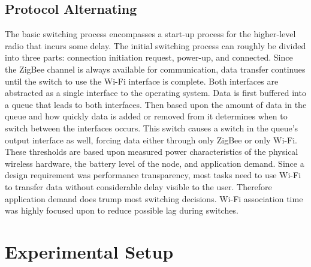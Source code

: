 \documentclass[conference]{IEEEtran}
\begin{document}
\subsection{Protocol Alternating}
The basic switching process encompasses a start-up process for the
higher-level radio that incurs some delay.  The initial switching
process can roughly be divided into three parts: connection
initiation request, power-up, and connected.  Since the ZigBee
channel is always available for communication, data transfer
continues until the switch to use the Wi-Fi interface is complete.
Both interfaces are abstracted as a single interface to the
operating system.  Data is first buffered into a queue that leads to
both interfaces.  Then based upon the amount of data in the queue
and how quickly data is added or removed from it determines when to
switch between the interfaces occurs.  This switch causes a switch
in the queue's output interface as well, forcing data either through
only ZigBee or only Wi-Fi.  These thresholds are based upon measured
power characteristics of the physical wireless hardware, the battery
level of the node, and application demand.  Since a design
requirement was performance transparency, most tasks need to use
Wi-Fi to transfer data without considerable delay visible to the
user.  Therefore application demand does trump most switching
decisions.  Wi-Fi association time was highly focused upon to reduce
possible lag during switches.

\section{Experimental Setup}
\end{document}
